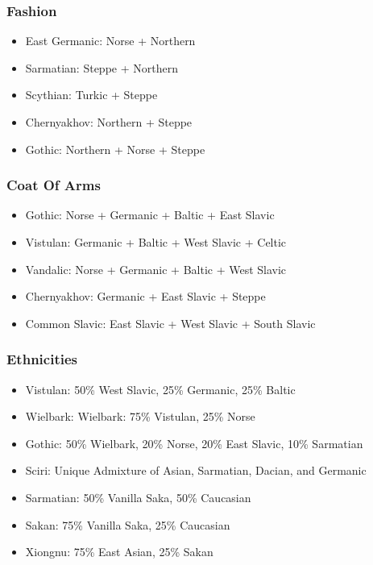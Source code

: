 \documentclass{article}
\begin{document}
	\subsubsection{Fashion}
	\begin{itemize}
		\item East Germanic: Norse + Northern
		\item Sarmatian: Steppe + Northern
		\item Scythian: Turkic + Steppe
		\item Chernyakhov: Northern + Steppe
		\item Gothic: Northern + Norse + Steppe
	\end{itemize}
	
	\subsubsection{Coat Of Arms}
	\begin{itemize}
		\item Gothic: Norse + Germanic + Baltic + East Slavic
		\item Vistulan: Germanic + Baltic + West Slavic + Celtic
		\item Vandalic: Norse + Germanic + Baltic + West Slavic
		\item Chernyakhov: Germanic + East Slavic + Steppe
		\item Common Slavic: East Slavic + West Slavic + South Slavic
	\end{itemize}
	
	\subsubsection{Ethnicities}
	\begin{itemize}
		\item Vistulan: 50\% West Slavic, 25\% Germanic, 25\% Baltic
		\item Wielbark: Wielbark: 75\% Vistulan, 25\% Norse
		\item Gothic: 50\% Wielbark, 20\% Norse, 20\% East Slavic, 10\% Sarmatian
		\item Sciri: Unique Admixture of Asian, Sarmatian, Dacian, and Germanic
		\item Sarmatian: 50\% Vanilla Saka, 50\% Caucasian
		\item Sakan: 75\% Vanilla Saka, 25\% Caucasian
		\item Xiongnu: 75\% East Asian, 25\% Sakan
	\end{itemize}
	
\end{document}
